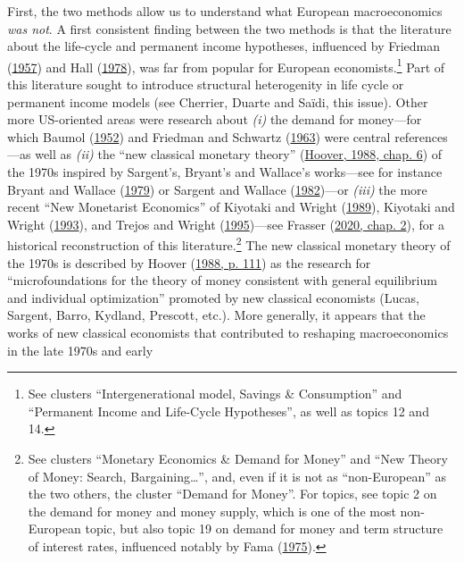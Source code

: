 \documentclass[
  12pt,
  onecolumn]{article}
\begin{document}
First, the two methods allow us to understand what European
macroeconomics \emph{was not}. A first consistent finding between the
two methods is that the literature about the life-cycle and permanent
income hypotheses, influenced by Friedman
(\protect\hyperlink{ref-friedman1957}{1957}) and Hall
(\protect\hyperlink{ref-hall1978b}{1978}), was far from popular for
European economists.\footnote{See clusters ``Intergenerational model,
  Savings \& Consumption'' and ``Permanent Income and Life-Cycle
  Hypotheses'', as well as topics 12 and 14.} Part of this literature
sought to introduce structural heterogenity in life cycle or permanent
income models (see Cherrier, Duarte and Saïdi, this issue). Other more
US-oriented areas were research about \emph{(i)} the demand for
money---for which Baumol (\protect\hyperlink{ref-baumol1952}{1952}) and
Friedman and Schwartz (\protect\hyperlink{ref-friedman1963}{1963}) were
central references---as well as \emph{(ii)} the ``new classical monetary
theory'' (\protect\hyperlink{ref-hoover1988}{Hoover, 1988, chap. 6}) of
the 1970s inspired by Sargent's, Bryant's and Wallace's works---see for
instance Bryant and Wallace (\protect\hyperlink{ref-bryant1979}{1979})
or Sargent and Wallace (\protect\hyperlink{ref-sargent1982}{1982})---or
\emph{(iii)} the more recent ``New Monetarist Economics'' of Kiyotaki
and Wright (\protect\hyperlink{ref-kiyotaki1989}{1989}), Kiyotaki and
Wright (\protect\hyperlink{ref-kiyotaki1993}{1993}), and Trejos and
Wright (\protect\hyperlink{ref-trejos1995}{1995})---see Frasser
(\protect\hyperlink{ref-frasser2020}{2020, chap. 2}), for a historical
reconstruction of this literature.\footnote{See clusters ``Monetary
  Economics \& Demand for Money'' and ``New Theory of Money: Search,
  Bargaining\ldots{}'', and, even if it is not as ``non-European'' as
  the two others, the cluster ``Demand for Money''. For topics, see
  topic 2 on the demand for money and money supply, which is one of the
  most non-European topic, but also topic 19 on demand for money and
  term structure of interest rates, influenced notably by Fama
  (\protect\hyperlink{ref-fama1975}{1975}).} The new classical monetary
theory of the 1970s is described by Hoover
(\protect\hyperlink{ref-hoover1988}{1988, p. 111}) as the research for
``microfoundations for the theory of money consistent with general
equilibrium and individual optimization'' promoted by new classical
economists (Lucas, Sargent, Barro, Kydland, Prescott, etc.). More
generally, it appears that the works of new classical economists that
contributed to reshaping macroeconomics in the late 1970s and early
\end{document}
